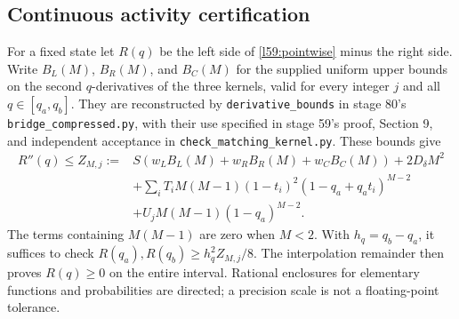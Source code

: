 \subsection{Continuous activity certification}
For a fixed state let $R(q)$ be the left side of \eqref{l59:pointwise} minus the right side. Write $B_L(M)$, $B_R(M)$, and $B_C(M)$ for the supplied uniform upper bounds on the second $q$-derivatives of the three kernels, valid for every integer $j$ and all $q\in[q_a,q_b]$. They are reconstructed by \nolinkurl{derivative_bounds} in stage 80's \nolinkurl{bridge_compressed.py}, with their use specified in stage 59's proof, Section 9, and independent acceptance in \nolinkurl{check_matching_kernel.py}. These bounds give
\begin{align*}
 R''(q)\le Z_{M,j}:={}&S(w_LB_L(M)+w_RB_R(M)+w_CB_C(M))+2D_\delta M^2\\
 &+\sum_iT_iM(M-1)(1-t_i)^2(1-q_a+q_at_i)^{M-2}\\
 &+U_jM(M-1)(1-q_a)^{M-2}.
\end{align*}
The terms containing $M(M-1)$ are zero when $M<2$. With $h_q=q_b-q_a$, it suffices to check $R(q_a),R(q_b)\ge h_q^2Z_{M,j}/8$. The interpolation remainder then proves $R(q)\ge0$ on the entire interval. Rational enclosures for elementary functions and probabilities are directed; a precision scale is not a floating-point tolerance.

